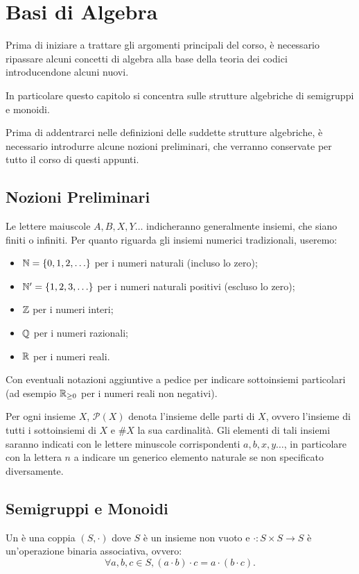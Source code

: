 \chapter{Basi di Algebra}

Prima di iniziare a trattare gli argomenti principali del corso,
è necessario ripassare alcuni concetti di algebra alla base della teoria dei codici introducendone alcuni nuovi.

In particolare questo capitolo si concentra sulle strutture algebriche di semigruppi e monoidi.

Prima di addentrarci nelle definizioni delle suddette strutture algebriche, è necessario introdurre alcune nozioni preliminari, che verranno conservate per tutto il corso di questi appunti.

\section{Nozioni Preliminari}

Le lettere maiuscole \(A, B, X, Y \ldots\) indicheranno generalmente insiemi, che siano finiti o infiniti.
Per quanto riguarda gli insiemi numerici tradizionali, useremo:
\begin{itemize}
  \item \(\N = \set{0,1,2,\ldots}\) per i numeri naturali (incluso lo zero);
  \item \(\N' = \set{1,2,3,\ldots}\) per i numeri naturali positivi (escluso lo zero);
  \item \(\mathbb{Z}\) per i numeri interi;
  \item \(\mathbb{Q}\) per i numeri razionali;
  \item \(\mathbb{R}\) per i numeri reali.
\end{itemize}
Con eventuali notazioni aggiuntive a pedice per indicare sottoinsiemi particolari (ad esempio \(\mathbb{R}_{\geq 0}\) per i numeri reali non negativi).

Per ogni insieme \(X\), \(\mathcal{P}(X)\) denota l'insieme delle parti di \(X\), ovvero l'insieme di tutti i sottoinsiemi di \(X\) e \(\#X\) la sua cardinalità.
Gli elementi di tali insiemi saranno indicati con le lettere minuscole corrispondenti \(a,b,x,y \ldots\), in particolare con la lettera \(n\) a indicare un generico elemento naturale se non specificato diversamente.

\section{Semigruppi e Monoidi}
\begin{definition}[Semigruppo]
  Un  è una coppia \((S, \cdot)\) dove \(S\) è un insieme non vuoto e \(\cdot : S \times S \to S\) è un'operazione binaria associativa, ovvero:
  \[\forall a,b,c \in S, (a \cdot b) \cdot c = a \cdot (b \cdot c).\]
\end{definition}

